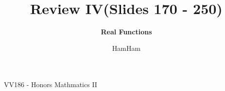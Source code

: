 \documentclass{beamer}
\title{\sffamily Review IV(Slides 170 - 250)}
\subtitle{\textbf{Real Functions}\\ }
\institute[UM-SJTU JI]{University of Michigan-Shanghai Jiao Tong University Joint Institute}
\author{HamHam}
\newcommand{\myfont}{\rmfamily\normalsize\upshape\mdseries}
\begin{document}
\begin{titlepage}
    \begin{center}
        VV186 - Honors Mathmatics II
    \end{center}
\end{titlepage}
\myfont
\end{document}
